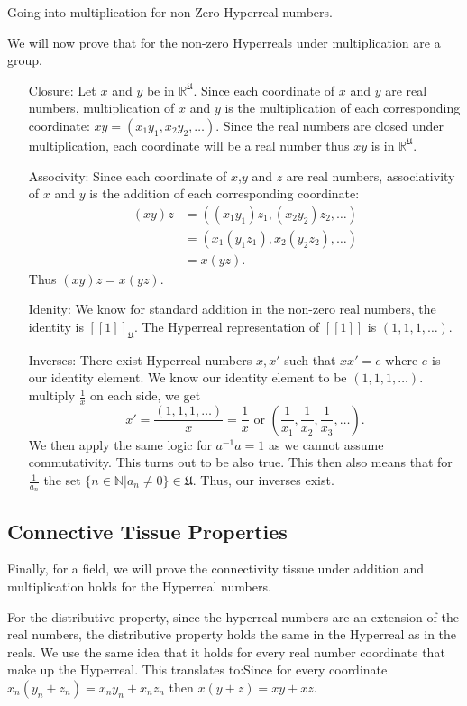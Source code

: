 \documentclass[12pt]{report}
\newcommand{\R}{\mathbb{R}}
\newcommand{\N}{\mathbb{N}}
\newcommand{\U}{\mathfrak{U}}
\begin{document}
\newline Going into multiplication for non-Zero Hyperreal numbers. \newline \par


We will now prove that for the non-zero Hyperreals under multiplication are a group.
\begin{enumerate}
    \item[Closure:]Let $x$ and $y$ be in $\R^{\U}$.
    Since each coordinate of $x$ and $y$ are real numbers, multiplication of $x$ and $y$ is the multiplication of each corresponding coordinate: $xy = (x_1 y_1, x_2 y_2,\ldots)$.
    Since the real numbers are closed under multiplication, each coordinate will be a real number thus $xy$ is in $\R^\U$.
    \item[Associvity:] Since each coordinate of $x$,$y$ and $z$ are real numbers, associativity of $x$ and $y $ is the addition of each corresponding coordinate:
    \begin{align*}
    (xy)z &= ((x_1 y_1)z_1, (x_2 y_2)z_2,\ldots) \\
    &= (x_1  (y_1 z_1), x_2(y_2 z_2),\ldots)\\
        &=x(yz).
    \end{align*}
    Thus $(xy)z= x(yz)$.
    \item[Idenity:]We know for standard addition in the non-zero real numbers, the identity is $[[1]]_{\U}$.
    The Hyperreal representation of $[[1]]$ is $(1, 1, 1,\ldots)$.
    \item[Inverses:]There exist Hyperreal numbers $x, x'$ such that $xx' = e $ where $e$ is our identity element.
    We know our identity element to be $(1, 1, 1, \ldots)$.
    multiply $\frac{1}{x}$ on each side, we get \[x' = \frac{(1, 1, 1,\ldots)}{x} = \frac{1}{x} \text{ or } (\frac{1}{x_1}, \frac{1}{x_2}, \frac{1}{x_3},\ldots).\] We then apply the same logic for $a^{-1} a =1$ as we cannot assume commutativity.
    This turns out to be also true.
    This then also means that for $\frac{1}{a_n}$ the set $\{n \in \N| a_n \not= 0 \} \in \U$.
    Thus, our inverses exist.
\end{enumerate}
\subsection*{Connective Tissue Properties}
Finally, for a field, we will prove the connectivity tissue under addition and multiplication holds for the Hyperreal numbers.
\newline \par
For the distributive property, since the hyperreal numbers are an extension of the real numbers, the distributive property holds the same in the Hyperreal as in the reals.
We use the same idea that it holds for every real number coordinate that make up the Hyperreal.
This translates to:\newline Since for every coordinate $x_n(y_n+z_n) = x_n y_n + x_n z_n$ then $x(y+z)= xy+xz$.\newline
\end{document}
